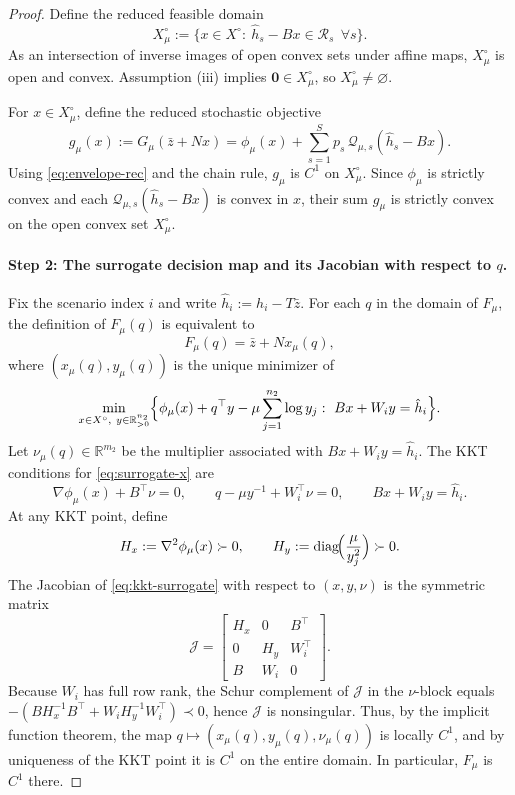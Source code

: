 \documentclass[11pt]{article}
\theoremstyle{plain}
\theoremstyle{definition}
\begin{document}
\begin{proof}
Define the reduced feasible domain
\[
X_\mu^\circ:=\{x\in X^\circ:\ \hat h_s-Bx\in\mathcal{R}_s\ \ \forall s\}.
\]
As an intersection of inverse images of open convex sets under affine maps, $X_\mu^\circ$ is open and convex.
Assumption \textnormal{(iii)} implies $\mathbf{0}\in X_\mu^\circ$, so $X_\mu^\circ\neq\varnothing$.

For $x\in X_\mu^\circ$, define the reduced stochastic objective
\[
g_\mu(x):=G_\mu(\bar z+Nx)
=\phi_\mu(x)+\sum_{s=1}^S p_s\,\mathcal{Q}_{\mu,s}(\hat h_s-Bx).
\]
Using \eqref{eq:envelope-rec} and the chain rule, $g_\mu$ is $C^1$ on $X_\mu^\circ$.
Since $\phi_\mu$ is strictly convex and each $\mathcal{Q}_{\mu,s}(\hat h_s-Bx)$ is convex in $x$,
their sum $g_\mu$ is strictly convex on the open convex set $X_\mu^\circ$.

\paragraph{Step 2: The surrogate decision map and its Jacobian with respect to $q$.}
Fix the scenario index $i$ and write $\hat h_i:=h_i-T\bar z$.
For each $q$ in the domain of $F_\mu$, the definition of $F_\mu(q)$ is equivalent to
\[
F_\mu(q)=\bar z+N x_\mu(q),
\]
where $(x_\mu(q),y_\mu(q))$ is the unique minimizer of
\begin{equation}
\label{eq:surrogate-x}
\min_{x\in X^\circ,\ y\in\mathbb{R}^{n_2}_{>0}}
\Bigl\{\phi_\mu(x)+q^\top y-\mu\sum_{j=1}^{n_2}\log y_j:\ Bx+W_i y=\hat h_i\Bigr\}.
\end{equation}
Let $\nu_\mu(q)\in\mathbb{R}^{m_2}$ be the multiplier associated with $Bx+W_i y=\hat h_i$.
The KKT conditions for \eqref{eq:surrogate-x} are
\begin{equation}
\label{eq:kkt-surrogate}
\nabla\phi_\mu(x)+B^\top\nu=0,\qquad
q-\mu y^{-1}+W_i^\top\nu=0,\qquad
Bx+W_i y=\hat h_i.
\end{equation}
At any KKT point, define
\[
H_x:=\nabla^2\phi_\mu(x)\succ0,\qquad
H_y:=\mathrm{diag}\!\Bigl(\frac{\mu}{y_j^2}\Bigr)\succ0.
\]
The Jacobian of \eqref{eq:kkt-surrogate} with respect to $(x,y,\nu)$ is the symmetric matrix
\[
\mathcal{J}
=
\begin{bmatrix}
H_x & 0 & B^\top\\
0 & H_y & W_i^\top\\
B & W_i & 0
\end{bmatrix}.
\]
Because $W_i$ has full row rank, the Schur complement of $\mathcal{J}$ in the $\nu$-block equals
$-(B H_x^{-1}B^\top+W_i H_y^{-1}W_i^\top)\prec0$, hence $\mathcal{J}$ is nonsingular.
Thus, by the implicit function theorem, the map $q\mapsto(x_\mu(q),y_\mu(q),\nu_\mu(q))$ is locally $C^1$,
and by uniqueness of the KKT point it is $C^1$ on the entire domain. In particular, $F_\mu$ is $C^1$ there.


\end{proof}
\end{document}
